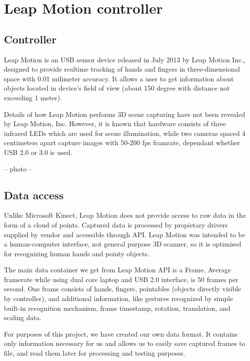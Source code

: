 \chapter{Leap Motion controller}\label{LMCChapter}

\section{Controller}
Leap Motion is an USB sensor device released in July 2013 by Leap Motion Inc., designed to provide realtime tracking of hands and fingers in three-dimensional space with 0.01 milimeter accuracy. It allows a user to get information about objects located in device's field of view (about 150 degree with distance not exceeding 1 meter).

Details of how Leap Motion performs 3D scene capturing have not been revealed by Leap Motion, Inc. However, it is known that hardware consists of three infrared LEDs which are used for scene illumination, while two cameras spaced 4 centimeters apart capture images with 50-200 fps framrate, dependant whether USB 2.0 or 3.0 is used.

-- photo -- 

\section{Data access}

Unlike Microsoft Kinect, Leap Motion does not provide access to raw data in the form of a cloud of points. Captured data is processed by propietary drivers supplied by vendor and accessible through API. Leap Motion was intended to be a human-computer interface, not general purpose 3D scanner, so it is optimised for recognizing human hands and pointy objects.

The main data container we get from Leap Motion API is a Frame. Average framerate while using dual core laptop and USB 2.0 interface, is 50 frames per second. One frame consists of hands, fingers, pointables (objects directly visible by controller), and additional information, like gestures recognized by simple built-in recognition mechanism, frame timestamp, rotation, translation, and scaling data. 

For purposes of this project, we have created our own data format. It contains only information necessary for us and allows us to easily save captured frames to file, and read them later for processing and testing purposes.
